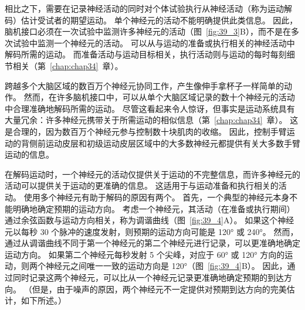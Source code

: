 


相比之下，需要在记录神经活动的同时对个体试验执行从神经活动（称为运动解码）估计受试者的期望运动。
单个神经元的活动不能明确提供此类信息。
因此，脑机接口必须在一次试验中监测许多神经元的活动（图~\ref{fig:39_3}B），而不是在多次试验中监测一个神经元的活动。
可以从与运动的准备或执行相关的神经活动中解码所需的运动。
而准备活动与运动目标相关，执行活动则与运动的每时每刻细节相关（第~\ref{chap:chap34}~章）。


跨越多个大脑区域的数百万个神经元协同工作，产生像伸手拿杯子一样简单的动作。
然而，在许多脑机接口中，可以从单个大脑区域记录的数十个神经元的活动中合理准确地解码所需的运动。
尽管这看起来令人惊讶，但事实是运动系统具有大量冗余：许多神经元携带关于所需运动的相似信息（第~\ref{chap:chap34}~章）。
这是合理的，因为数百万个神经元参与控制数十块肌肉的收缩。
因此，控制手臂运动的背侧前运动皮层和初级运动皮层区域中的大多数神经元都提供有关大多数手臂运动的信息。


在解码运动时，一个神经元的活动仅提供关于运动的不完整信息，而许多神经元的活动可以提供关于运动的更准确的信息。
这适用于与运动准备和执行相关的活动。
使用多个神经元有助于解码的原因有两个。
首先，一个典型的神经元本身不能明确地确定预期的运动方向。
考虑一个神经元，其活动（在准备或执行期间）通过余弦函数与运动方向相关，称为调谐曲线（图~\ref{fig:39_4}A）。
如果这个神经元以每秒 30 个脉冲的速度发射，则预期的运动方向可能是 120° 或 240°。
然而，通过从调谐曲线不同于第一个神经元的第二个神经元进行记录，可以更准确地确定运动方向。
如果第二个神经元每秒发射 5 个尖峰，对应于 60° 或 120° 方向的运动，则两个神经元之间唯一一致的运动方向是 120°（图~\ref{fig:39_4}B）。
因此，通过同时记录这两个神经元，可以比从一个神经元记录更准确地确定预期的到达方向。
（但是，由于噪声的原因，两个神经元不一定提供对预期到达方向的完美估计，如下所述。）


